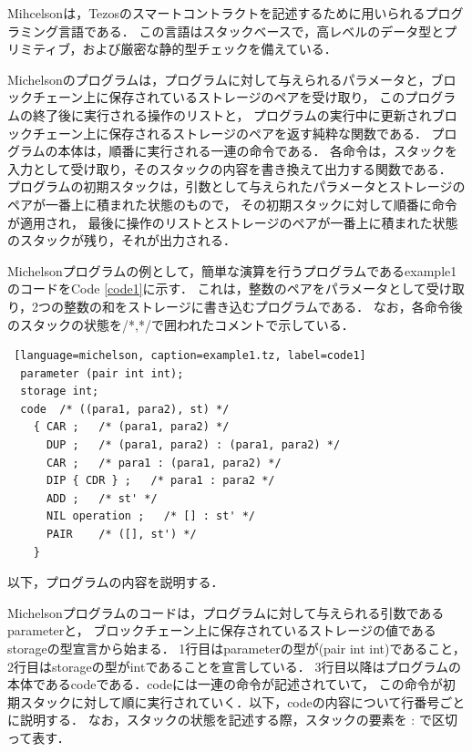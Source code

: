 \documentclass{kuisthesis}
\begin{document}
Mihcelsonは，Tezosのスマートコントラクトを記述するために用いられるプログラミング言語である．
この言語はスタックベースで，高レベルのデータ型とプリミティブ，および厳密な静的型チェックを備えている．

Michelsonのプログラムは，プログラムに対して与えられるパラメータと，ブロックチェーン上に保存されているストレージのペアを受け取り，
このプログラムの終了後に実行される操作のリストと，
プログラムの実行中に更新されブロックチェーン上に保存されるストレージのペアを返す純粋な関数である．
プログラムの本体は，順番に実行される一連の命令である．
各命令は，スタックを入力として受け取り，そのスタックの内容を書き換えて出力する関数である．
プログラムの初期スタックは，引数として与えられたパラメータとストレージのペアが一番上に積まれた状態のもので，
その初期スタックに対して順番に命令が適用され，
最後に操作のリストとストレージのペアが一番上に積まれた状態のスタックが残り，それが出力される．

Michelsonプログラムの例として，簡単な演算を行うプログラムであるexample1のコードをCode \ref{code1}に示す．
これは，整数のペアをパラメータとして受け取り，2つの整数の和をストレージに書き込むプログラムである．
なお，各命令後のスタックの状態を/*,*/で囲われたコメントで示している．
\\
\begin{lstlisting} [language=michelson, caption=example1.tz, label=code1]
  parameter (pair int int); 
  storage int;
  code  /* ((para1, para2), st) */
    { CAR ;   /* (para1, para2) */
      DUP ;   /* (para1, para2) : (para1, para2) */
      CAR ;   /* para1 : (para1, para2) */
      DIP { CDR } ;   /* para1 : para2 */
      ADD ;   /* st' */
      NIL operation ;   /* [] : st' */
      PAIR    /* ([], st') */
    }
\end{lstlisting}

以下，プログラムの内容を説明する．

Michelsonプログラムのコードは，プログラムに対して与えられる引数であるparameterと，
ブロックチェーン上に保存されているストレージの値であるstorageの型宣言から始まる．
1行目はparameterの型が(pair int int)であること，2行目はstorageの型がintであることを宣言している．
3行目以降はプログラムの本体であるcodeである．codeには一連の命令が記述されていて，
この命令が初期スタックに対して順に実行されていく．以下，codeの内容について行番号ごとに説明する．
なお，スタックの状態を記述する際，スタックの要素を : で区切って表す．
\end{document}
